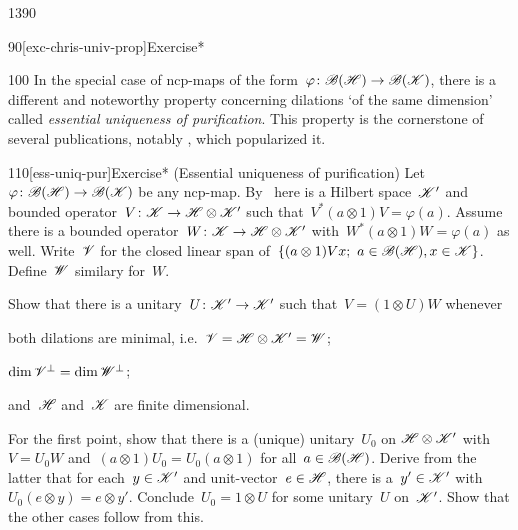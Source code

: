 \begin{parsec}{1390}
\begin{point}{90}[exc-chris-univ-prop]{Exercise*}
\spacingfix{}
\begin{point}{100}%
In the special case of ncp-maps
    of the form~$\varphi \colon \mathscr{B}(\mathscr{H}) \to \mathscr{B}(\mathscr{K})$,
    there is a different and noteworthy  property
    concerning dilations `of the same dimension'
    called \emph{essential uniqueness of purification}.
This property is the cornerstone of several publications,
    notably \cite{chiribella}, which popularized it.
\end{point}
\end{point}
\begin{point}{110}[ess-uniq-pur]{Exercise* (Essential uniqueness of purification)}
    Let~$\varphi \colon \mathscr{B}(\mathscr{H}) \to \mathscr{B}(\mathscr{K})$
        be any ncp-map.
    By~
    here is a Hilbert space~$\mathscr{K}'$
        and bounded operator~$V\colon \mathscr{K} \to \mathscr{H} \otimes \mathscr{K}'$
        such that~$V^* (a\otimes 1) V = \varphi(a)$.
        Assume there is a bounded
            operator~$W\colon \mathscr{K} \to \mathscr{H} \otimes \mathscr{K}'$
        with~$W^* (a \otimes 1) W = \varphi(a)$ as well.
Write~$\mathscr{V}$ for the closed linear span
        of~$\{(a \otimes 1) V x;\  a \in \mathscr{B}(\mathscr{H}), x \in \mathscr{K}\}$.
Define~$\mathscr{W}$ similary for~$W$.

Show that there is a unitary~$U \colon \mathscr{K}' \to \mathscr{K}'$
        such that~$V = (1 \otimes U) W$
    whenever
\begin{inparaenum}
\item both dilations are minimal,
    i.e.~$\mathscr{V} = \mathscr{H} \otimes \mathscr{K}' = \mathscr{W}$;
\item
    $\dim \mathscr{V}^\perp = \dim \mathscr{W}^\perp$;
\item
    and~$\mathscr{H}$ and~$\mathscr{K}$ are finite dimensional.
\end{inparaenum}
For the first point, show that there is a (unique) unitary~$U_0$ on $\mathscr{H} \otimes \mathscr{K}'$
        with~$V = U_0 W$ and~$(a \otimes 1) U_0 = U_0 (a \otimes 1)$
            for all~$a \in \mathscr{B}(\mathscr{H})$.
    Derive from the latter
    that for each~$y \in \mathscr{K}'$ and unit-vector~$e \in \mathscr{H}$,
        there is a~$y' \in \mathscr{K}'$
        with~$U_0 (e \otimes y) = e \otimes y'$.
    Conclude~$U_0 = 1 \otimes U$ for some unitary~$U$ on~$\mathscr{K}'$.
    Show that the other cases follow from this.
\end{point}
\end{parsec}
